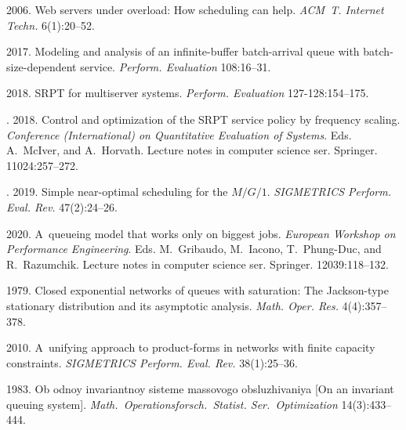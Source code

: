  \begin{multicols}{2}

\renewcommand{\bibname}{\protect\rmfamily References}

{\small\frenchspacing
 {%
 \begin{thebibliography}{99}

 2006. 
Web servers under overload: How scheduling can help.
\textit{ACM~T. Internet Techn.} 6(1):20--52.

 2017.
Modeling and analysis of an infinite-buffer batch-arrival
queue with batch-size-dependent service.
\textit{Perform. Evaluation} 108:16--31.

 2018.
SRPT for multiserver systems. \textit{Perform. Evaluation} 127-128:154--175.

. 2018.
Control and optimization of the SRPT service policy by frequency scaling.
\textit{Conference (International) on Quantitative Evaluation of 
Systems}. 
Eds. A.~McIver, and A.~Horvath. Lecture notes in computer science ser. 
Springer. 11024:257--272.

. 2019. 
Simple near-optimal scheduling for the $M/G/1$.
\textit{\mbox{SIGMETRICS} Perform. Eval. Rev.} 47(2):24--26.

 2020. A~queueing model that works
only on biggest jobs. \textit{European Workshop on Performance 
Engineering}.
Eds. M.~Gribaudo, M.~Iacono, T.~Phung-Duc, and R.~Razumchik.
Lecture notes in computer science ser. Springer. 12039:118--132.

 1979.
Closed exponential networks of queues with saturation: The Jackson-type 
stationary distribution and its asymptotic analysis. 
\textit{Math. Oper. Res.} 4(4):357--378.

 2010. 
A~unifying approach to product-forms in
networks with finite capacity constraints.
\textit{SIGMETRICS Perform. Eval. Rev.} 38(1):25--36.

 1983.
Ob odnoy invariantnoy sisteme massovogo
obsluzhivaniya [On an invariant queuing system]. \textit{Math.\ 
Operationsforsch.\ Statist. Ser.\ Optimization} 14(3):433--444.


\end{thebibliography}}}
\end{multicols}
